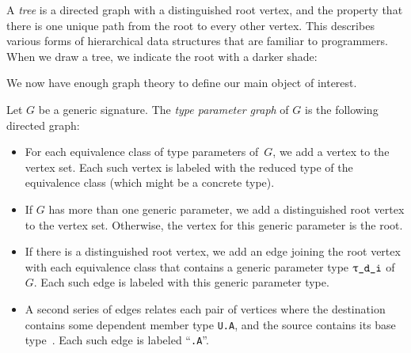 \documentclass[../generics]{subfiles}
\begin{document}
\begin{definition} A \emph{tree} is a directed graph with a distinguished root vertex, and the property that there is one unique path from the root to every other vertex. This describes various forms of hierarchical data structures that are familiar to programmers. When we draw a tree, we indicate the root with a darker shade:
\begin{center}
\end{center}
\end{definition}

\smallskip
We now have enough graph theory to define our main object of interest.
\begin{definition}
Let $G$ be a generic signature. The \emph{type parameter graph} of $G$ is the following directed graph:
\begin{itemize}
\item For each equivalence class of type parameters of~$G$, we add a vertex to the vertex set. Each such vertex is labeled with the reduced type of the equivalence class (which might be a concrete type).
\item If $G$ has more than one generic parameter, we add a distinguished root vertex to the vertex set. Otherwise, the vertex for this generic parameter is the root.
\item If there is a distinguished root vertex, we add an edge joining the root vertex with each equivalence class that contains a generic parameter type $\ttgp{d}{i}$ of $G$. Each such edge is labeled with this generic parameter type.
\item A second series of edges relates each pair of vertices where the destination contains some dependent member type \texttt{U.A}, and the source contains its base type~\tU. Each such edge is labeled ``\texttt{.A}''.
\end{itemize}
\end{definition}
\end{document}
